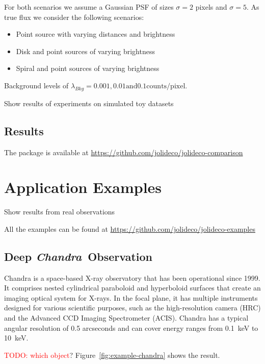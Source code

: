 \documentclass[twocolumn]{aastex631}
\newcommand{\chandra}{\textit{Chandra}~}
\newcommand{\todo}[1]{\textcolor{red}{TODO: #1}\PackageWarning{TODO:}{#1!}}
\begin{document}
    For both scenarios we assume a Gaussian PSF of sizes $\sigma = 2$ pixels and  $\sigma = 5$.
    As true flux we consider the following scenarios:

    \begin{itemize}
        \item Point source with varying distances and brightness
        \item Disk and point sources of varying brightness
        \item Spiral and point sources of varying brightness
    \end{itemize}

    Background levels of $\lambda_{Bkg}= 0.001, 0.01 \textrm{and} 0.1 \textrm{counts/pixel}$. 
    
    Show results of experiments on simulated toy datasets

    

    \subsection{Results}

    The package is available at \url{https://github.com/jolideco/jolideco-comparison}


    \section{Application Examples}
    Show results from real observations

    All the examples can be found at \url{https://github.com/jolideco/jolideco-examples}

    \subsection{Deep \chandra Observation}
    Chandra is a space-based X-ray observatory that has been operational since 1999. It comprises nested cylindrical paraboloid and hyperboloid surfaces that create an imaging optical system for X-rays. In the focal plane, it has multiple instruments designed for various scientific purposes, such as the high-resolution camera (HRC) and the Advanced CCD Imaging Spectrometer (ACIS). Chandra has a typical angular resolution of 0.5 arcseconds and can cover energy ranges from \qty[mode = text]{0.1}{keV} to  \qty[mode = text]{10}{keV}.

    \todo{which object}?
    Figure~\ref{fig:example-chandra} shows the result.
    
\end{document}
